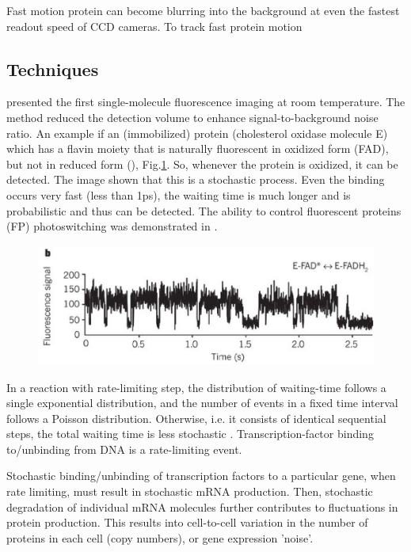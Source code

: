 Fast motion protein can become blurring into the background at even the fastest
readout speed of CCD cameras.  To track fast protein motion


\subsection{Techniques}

\citep{hirschfeld1976} presented the first single-molecule fluorescence imaging
at room temperature. The method reduced the detection volume to enhance
signal-to-background noise ratio. An example if an (immobilized) protein
(cholesterol oxidase molecule E) which has a flavin moiety that is naturally
fluorescent in oxidized form (FAD), but not in reduced form (),
Fig.\ref{fig:hirschfeld1976}. So, whenever the protein is oxidized, it can be
detected. The image shown that this is a stochastic process. Even the binding
occurs very fast (less than 1ps), the waiting time is much longer and is
probabilistic and thus can be detected. The ability to control fluorescent
proteins (FP) photoswitching was demonstrated in \citep{dickson1997}. 

\begin{figure}[hbt]
  \centerline{\includegraphics[height=4cm,
    angle=0]{./images/protein_fluoscent_hirschfeld1976.eps}}
\caption{}
\label{fig:hirschfeld1976}
\end{figure}


In a reaction with rate-limiting step, the distribution of
waiting-time follows a single exponential distribution, and the number of events
in a fixed time interval follows a Poisson distribution.
Otherwise, i.e. it consists of identical sequential steps, the total waiting
time is less stochastic \citep{li2012}. Transcription-factor binding
to/unbinding from DNA is a rate-limiting event. 

Stochastic binding/unbinding of transcription factors to a particular gene, when
rate limiting, must result in stochastic mRNA production. Then, stochastic
degradation of individual mRNA molecules further contributes to fluctuations in
protein production. This results into cell-to-cell variation in the number of
proteins in each cell (copy numbers), or gene expression 'noise'. 

